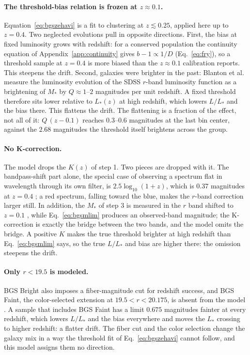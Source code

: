 \documentclass[11pt]{article}
\begin{document}
\paragraph{The threshold-bias relation is frozen at $z \approx 0.1$.}
Equation~\eqref{eq:bgszehavi} is a fit to clustering at
$z \lesssim 0.25$, applied here up to $z = 0.4$.  Two neglected
evolutions pull in opposite directions.  First, the bias at fixed
luminosity grows with redshift: for a conserved population the
continuity equation of Appendix~\ref{app:continuity} gives
$b - 1 \propto 1/D$ (Eq.~\eqref{eq:fry}), so a threshold sample at
$z = 0.4$ is more biased than the $z \approx 0.1$ calibration
reports.  This steepens the drift.  Second, galaxies were brighter
in the past: Blanton et al. \cite{Blanton2003} measure the
luminosity evolution of the SDSS $r$-band luminosity function as a
brightening of $M_*$ by $Q \approx 1$--$2$ magnitudes per unit
redshift.  A fixed threshold therefore sits lower relative to
$L_*(z)$ at high redshift, which lowers $L/L_*$ and the bias there.
This flattens the drift.  The flattening is a fraction of the
effect, not all of it: $Q\,(z - 0.1)$ reaches $0.3$--$0.6$
magnitudes at the last bin center, against the $2.68$ magnitudes the
threshold itself brightens across the group.

\paragraph{No K-correction.}
The model drops the $K(z)$ of step 1.  Two pieces are dropped with
it.  The bandpass-shift part alone, the special case of observing a
spectrum flat in wavelength through its own filter, is
$2.5\log_{10}(1+z)$, which is $0.37$ magnitudes at $z = 0.4$
\cite{BlantonRoweis2007}; a red spectrum, falling toward the blue,
makes the $r$-band correction larger still.  In addition, the $M_*$
of step 3 is measured in the $r$ band shifted to $z = 0.1$
\cite{Blanton2003}, while Eq.~\eqref{eq:bgsmlim} produces an
observed-band magnitude; the K-correction is exactly the bridge
between the two bands, and the model omits the bridge.  A positive
$K$ makes the true threshold brighter at high redshift than
Eq.~\eqref{eq:bgsmlim} says, so the true $L/L_*$ and bias are higher
there: the omission steepens the drift.

\paragraph{Only $r < 19.5$ is modeled.}
BGS Bright also imposes a fiber-magnitude cut for redshift success,
and BGS Faint, the color-selected extension at
$19.5 < r < 20.175$, is absent from the model \cite{Hahn2023}.  A
sample that includes BGS Faint has a limit $0.675$ magnitudes
fainter at every redshift, which lowers $L/L_*$ and the bias
everywhere and moves the $L_*$ crossing to higher redshift: a
flatter drift.  The fiber cut and the color selection change the
galaxy mix in a way the threshold fit of
Eq.~\eqref{eq:bgszehavi} cannot follow, and this model assigns them
no direction.
\end{document}
